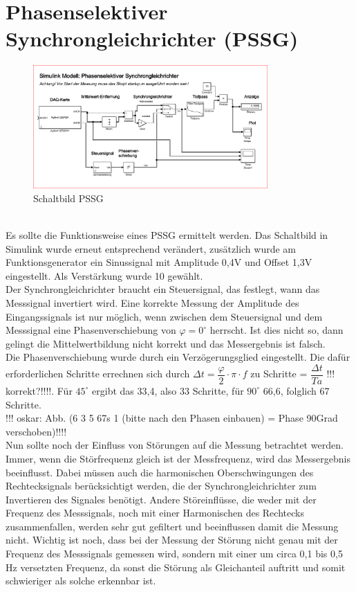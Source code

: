\section{Phasenselektiver Synchrongleichrichter (PSSG)}

\begin{figure}[h]
	\centering
	\includegraphics[width=0.8\textwidth]{./img/6_3_5}
	\caption{Schaltbild PSSG}
	\label{fg:schalt_pssg}
\end{figure}
~\\
Es sollte die Funktionsweise eines PSSG ermittelt werden. Das Schaltbild in Simulink wurde erneut entsprechend verändert, zusätzlich wurde am Funktionsgenerator ein Sinussignal mit Amplitude 0,4V und Offset 1,3V eingestellt. Als Verstärkung wurde 10 gewählt.
~\\
Der Synchrongleichrichter braucht ein Steuersignal, das festlegt, wann das Messsignal invertiert wird. Eine korrekte Messung der Amplitude des Eingangssignals ist nur möglich, wenn zwischen dem Steuersignal und dem Messsignal eine Phasenverschiebung von $\varphi= 0^\circ $ herrscht. Ist dies nicht so, dann gelingt die Mittelwertbildung nicht korrekt und das Messergebnis ist falsch.
~\\
Die Phasenverschiebung wurde durch ein Verzögerungsglied eingestellt. Die dafür erforderlichen Schritte errechnen sich durch $\Delta t = \dfrac{\varphi}{2} \cdot \pi \cdot f$ zu Schritte = $\dfrac{\Delta t}{Ta}$ !!! korrekt?!!!!. Für $45^\circ$  ergibt das 33,4, also 33 Schritte, für $90^\circ$  66,6, folglich 67 Schritte.
~\\
!!! oskar: Abb. (6 3 5 67s 1 (bitte nach den Phasen einbauen) = Phase 90Grad verschoben)!!!!
~\\
Nun sollte noch der Einfluss von Störungen auf die Messung betrachtet werden. Immer, wenn die Störfrequenz gleich ist der Messfrequenz, wird das Messergebnis beeinflusst. Dabei müssen auch die harmonischen Oberschwingungen des Rechtecksignals berücksichtigt werden, die der Synchrongleichrichter zum Invertieren des Signales benötigt. Andere Störeinflüsse, die weder mit der Frequenz des Messsignals, noch mit einer Harmonischen des Rechtecks zusammenfallen, werden sehr gut gefiltert und beeinflussen damit die Messung nicht. Wichtig ist noch, dass bei der Messung der Störung nicht genau mit der Frequenz des Messsignals gemessen wird, sondern mit einer um circa 0,1 bis 0,5 Hz versetzten Frequenz, da sonst die Störung als Gleichanteil auftritt und somit schwieriger als solche erkennbar ist.
